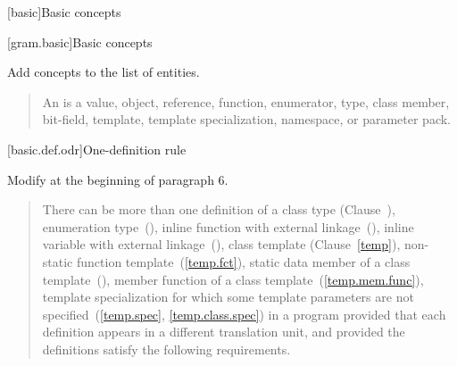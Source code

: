 [basic]{Basic concepts}

[gram.basic]{Basic concepts}

Add concepts to the list of entities.

\begin{quote}
\setcounter{Paras}{2}
\pnum
An  is a value, object, reference, function, enumerator, type,
class member, bit-field, template,  template specialization, 
namespace, or parameter pack.
\end{quote}

[basic.def.odr]{One-definition rule}

Modify at the beginning of paragraph 6.

\begin{quote}
\setcounter{Paras}{5}
\pnum
There can be more than one definition of a class type
(Clause~), enumeration type~(), inline function
with external linkage~(), inline variable with external
linkage~(), class template
(Clause~\ref{temp}), non-static function template~(\ref{temp.fct}),
static data member of a class template~(), member
function of a class template~(\ref{temp.mem.func}),  template
specialization for which some template parameters are not
specified~(\ref{temp.spec}, \ref{temp.class.spec})\added{,}
 in a program provided
that each definition appears in a different translation unit, and
provided the definitions satisfy the following requirements.
\end{quote}
